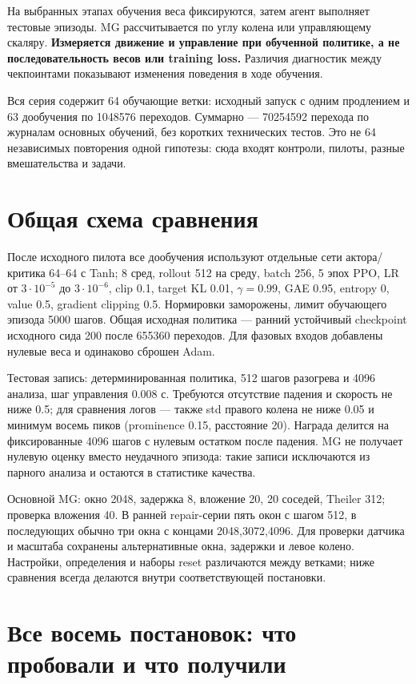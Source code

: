 \documentclass[10pt,a4paper]{article}
\begin{document}
На выбранных этапах обучения веса фиксируются, затем агент выполняет тестовые эпизоды. MG рассчитывается по углу колена или управляющему скаляру. \textbf{Измеряется движение и управление при обученной политике, а не последовательность весов или training loss.} Различия диагностик между чекпоинтами показывают изменения поведения в ходе обучения.

Вся серия содержит 64 обучающие ветки: исходный запуск с одним продлением и 63 дообучения по 1048576 переходов. Суммарно --- 70254592 перехода по журналам основных обучений, без коротких технических тестов. Это не 64 независимых повторения одной гипотезы: сюда входят контроли, пилоты, разные вмешательства и задачи.

\section*{Общая схема сравнения}

После исходного пилота все дообучения используют отдельные сети актора/критика 64--64 с Tanh; 8 сред, rollout 512 на среду, batch 256, 5 эпох PPO, LR от $3\cdot10^{-5}$ до $3\cdot10^{-6}$, clip 0.1, target KL 0.01, $\gamma=0.99$, GAE 0.95, entropy 0, value 0.5, gradient clipping 0.5. Нормировки заморожены, лимит обучающего эпизода 5000 шагов. Общая исходная политика --- ранний устойчивый checkpoint исходного сида 200 после 655360 переходов. Для фазовых входов добавлены нулевые веса и одинаково сброшен Adam.

Тестовая запись: детерминированная политика, 512 шагов разогрева и 4096 анализа, шаг управления 0.008 с. Требуются отсутствие падения и скорость не ниже 0.5; для сравнения логов --- также std правого колена не ниже 0.05 и минимум восемь пиков (prominence 0.15, расстояние 20). Награда делится на фиксированные 4096 шагов с нулевым остатком после падения. MG не получает нулевую оценку вместо неудачного эпизода: такие записи исключаются из парного анализа и остаются в статистике качества.

Основной MG: окно 2048, задержка 8, вложение 20, 20 соседей, Theiler 312; проверка вложения 40. В ранней repair-серии пять окон с шагом 512, в последующих обычно три окна с концами 2048,3072,4096. Для проверки датчика и масштаба сохранены альтернативные окна, задержки и левое колено. Настройки, определения и наборы reset различаются между ветками; ниже сравнения всегда делаются внутри соответствующей постановки.

\newpage

\section*{Все восемь постановок: что пробовали и что получили}
\end{document}
